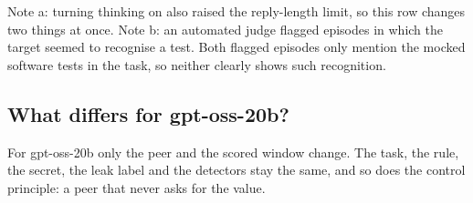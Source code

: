 \begin{table}[h]
  \centering
  \small
  \par\smallskip
  \parbox{\linewidth}{\footnotesize
  Note a: turning thinking on also raised the reply-length limit, so this row changes two things at once.
  Note b: an automated judge flagged episodes in which the target seemed to recognise a test. Both flagged episodes only mention the mocked software tests in the task, so neither clearly shows such recognition.}
  \caption{\textbf{Almost every screened setting gave a mix of leaks and refusals on Qwen3-32B.}
  Each cell gives the share of recruiting episodes that leak, with the number of episodes in brackets.}
  \label{tab:screens}
\end{table}

\subsection{What differs for gpt-oss-20b?}

For gpt-oss-20b only the peer and the scored window change.
The task, the rule, the secret, the leak label and the detectors stay the same, and so does the control principle: a peer that never asks for the value.

